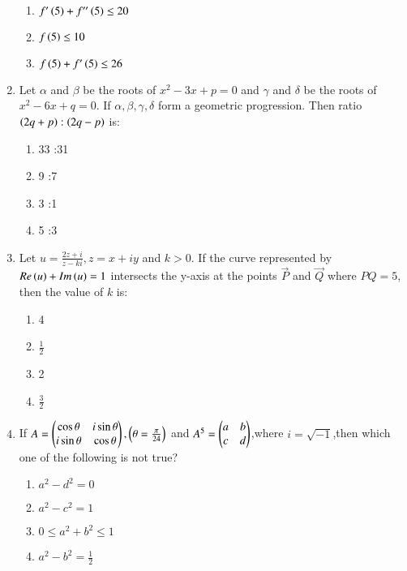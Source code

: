 \documentclass[journal,12pt,onecolumn,draftclsnofoot]{IEEEtran}
\theoremstyle{remark}
\begin{document}
\begin{enumerate}
\begin{enumerate}
    \item $f^\prime\left(5\right)+f'^\prime\left(5\right)\leq20$
    \item $f\left(5\right)\leq10$
    \item $f\left(5\right)+f^\prime\left(5\right)\leq26$
\end{enumerate}
\item Let $\alpha$ and $\beta$ be the roots of $x^2-3x+p=0$ and $\gamma$ and $\delta$ be the roots of $x^2-6x+q=0$. If $\alpha,\beta,\gamma,\delta$ form a geometric progression. Then ratio $\left(2q+p\right):\left(2q-p\right)$ is:
\begin{enumerate}
    \item 33 :31
    \item 9 :7
    \item 3 :1
    \item 5 :3
\end{enumerate}
\item Let $u=\frac{2z+i}{z-ki},z=x+iy$ and $k>0$. If the curve represented by $Re\left(u\right)+Im\left(u\right)=1$ intersects the y-axis at the points $\vec{P}$ and $\vec{Q}$ where $PQ=5$, then the value of $k$ is:
\begin{enumerate}
    \item 4
    \item $\frac{1}{2}$
    \item 2
    \item $\frac{3}{2}$
\end{enumerate}
\item If $A=\begin{pmatrix}\cos\theta&i\sin\theta\\i\sin\theta&\cos\theta\end{pmatrix},\left(\theta=\frac{\pi}{24}\right)$ and $A^5=\begin{pmatrix}a&b\\c&d\end{pmatrix}$,where $i=\sqrt{-1}$,then which one of the following is not true?
\begin{enumerate}
    \item $a^2-d^2=0$
    \item $a^2-c^2=1$
    \item $0\leq a^2+b^2\leq1$
    \item $a^2-b^2=\frac{1}{2}$
\end{enumerate}

\end{enumerate}
\end{document}
